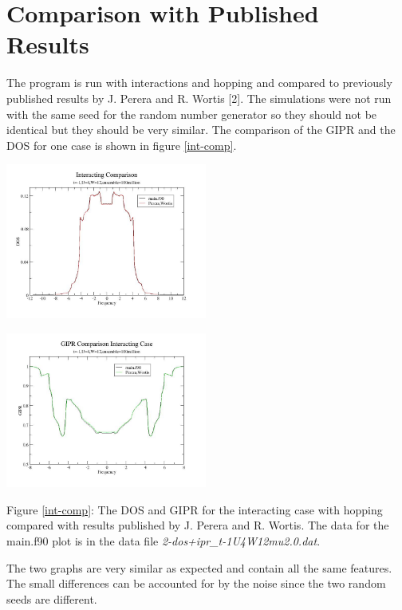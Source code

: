 \documentclass{article}
\begin{document}
\section{Comparison with Published Results}
The program is run with interactions and hopping and compared to previously published results by J. Perera and R. Wortis [2]. The simulations were not run with the same seed for the random number generator so they should not be identical but they should be very similar. The comparison of the GIPR and the DOS for one case is shown in figure \ref{int-comp}.
\begin{multicols}{2} \label{int-comp}
\begin{center}
	\includegraphics[width=250px]{dos_compareu4.jpg} \\
\end{center}
\begin{center}
	\includegraphics[width=250px]{gipr_compareu4.jpg} \\
\end{center}
\end{multicols}
\begin{center}
Figure \ref{int-comp}: The DOS and GIPR for the interacting case with hopping compared with results published by J. Perera and R. Wortis. The data for the main.f90 plot is in the data file \textit{2-dos+ipr\_t-1U4W12mu2.0.dat}.
\end{center}
The two graphs are very similar as expected and contain all the same features. The small differences can be accounted for by the noise since the two random seeds are different.
\end{document}
